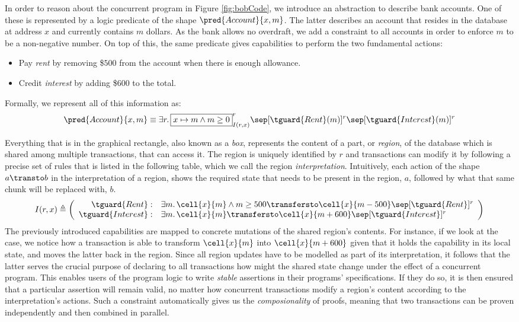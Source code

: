 In order to reason about the concurrent program in Figure \ref{fig:bobCode}, we introduce an abstraction to describe bank accounts. One of these is represented by a logic predicate of the shape $\pred{Account}{x, m}$. The latter describes an account that resides in the database at address $x$ and currently contains $m$ dollars. As the bank allows no overdraft, we add a constraint to all accounts in order to enforce $m$ to be a non-negative number. On top of this, the same predicate gives capabilities to perform the two fundamental actions:
\begin{itemize}
	\item Pay \textit{rent} by removing \$$500$ from the account when there is enough allowance.
	
	\item Credit \textit{interest} by adding \$$600$ to the total.
\end{itemize}
Formally, we represent all of this information as:
\[
	\pred{Account}{x, m}
		\equiv
	\exists r \ldotp \boxed{x \mapsto m \land m \geq 0}^r_{I(r, x)}
	\sep [\tguard{Rent}(m)]^r \sep [\tguard{Interest}(m)]^r
\]

Everything that is in the graphical rectangle, also known as a \textit{box}, represents the content of a part, or \textit{region}, of the database which is shared among multiple transactions, that can access it. The region is uniquely identified by $r$ and transactions can modify it by following a precise set of rules that is listed in the following table, which we call the region \textit{interpretation}. Intuitively, each action of the shape $a \transto b$ in the interpretation of a region, shows the required state that needs to be present in the region, $a$, followed by what that same chunk will be replaced with, $b$.
\[
	I(r, x) \triangleq \left( 
		\begin{array}{r l}
			\tguard{Rent}:
				&
			\exists m \ldotp \cell{x}{m} \land m \geq 500 \transfersto \cell{x}{m - 500} \sep [\tguard{Rent}]^r
			\\
			\tguard{Interest}:
				&
			\exists m \ldotp \cell{x}{m} \transfersto \cell{x}{m + 600} \sep [\tguard{Interest}]^r
		\end{array}
	 \right)
\]
The previously introduced capabilities are mapped to concrete mutations of the shared region's contents. For instance, if we look at the  case, we notice how a transaction is able to transform $\cell{x}{m}$ into $\cell{x}{m + 600}$ given that it holds the capability in its local state, and moves the latter back in the region. Since all region updates have to be modelled as part of its interpretation, it follows that the latter serves the crucial purpose of declaring to all transactions how might the shared state change under the effect of a concurrent program. This enables users of the program logic to write \textit{stable} assertions in their programs' specifications. If they do so, it is then ensured that a particular assertion will remain valid, no matter how concurrent transactions modify a region's content according to the interpretation's actions. Such a constraint automatically gives us the \textit{composionality} of proofs, meaning that two transactions can be proven independently and then combined in parallel.

